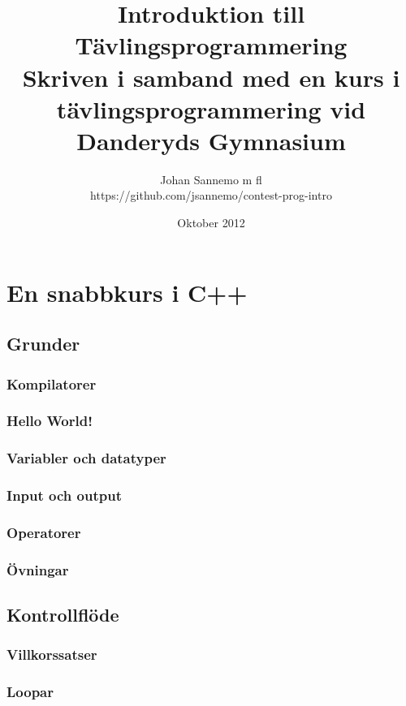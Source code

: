 \documentclass[10pt,a4paper]{report}
\author{Johan Sannemo m fl\\\small{https://github.com/jsannemo/contest-prog-intro}}
\title{Introduktion till Tävlingsprogrammering\\\small{Skriven i samband med en kurs i tävlingsprogrammering vid Danderyds Gymnasium}}
\date{Oktober 2012}
\begin{document}
\maketitle
\tableofcontents



\chapter{En snabbkurs i C++}

\section{Grunder}
	
\subsection{Kompilatorer}

\subsection{Hello World!}

\subsection{Variabler och datatyper}

\subsection{Input och output}

\subsection{Operatorer}

\subsection{Övningar}


\section{Kontrollflöde}
\subsection{Villkorssatser}

\subsection{Loopar}

\end{document}
